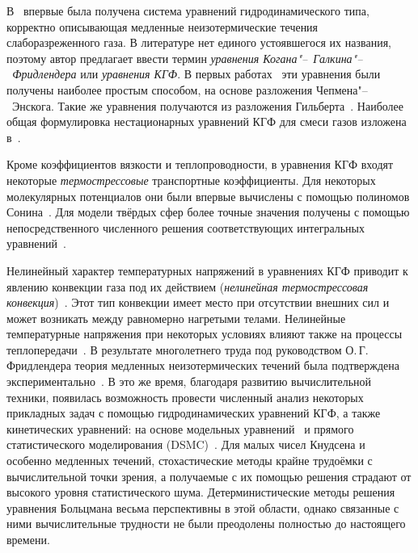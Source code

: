 \documentclass[
aps,%
12pt,%
final,%
notitlepage,%
oneside,%
onecolumn,%
nobibnotes,%
nofootinbib,%
superscriptaddress,%
noshowpacs,%
showkeys,%
centertags]%
{revtex4}
\begin{document}
В~\cite{Kogan1970} впервые была получена система уравнений гидродинамического типа,
корректно описывающая медленные неизотермические течения слаборазреженного газа.
В литературе нет единого устоявшегося их названия,
поэтому автор предлагает ввести термин \emph{уравнения Когана"--~Галкина"--~Фридлендера}
или \emph{уравнения КГФ}.
В первых работах~\cite{Kogan1970, Kogan1971} эти уравнения были получены наиболее простым способом,
на основе разложения Чепмена"--~Энскога. Такие же уравнения получаются из разложения Гильберта~\cite{Galkin1974}.
Наиболее общая формулировка нестационарных уравнений КГФ для смеси газов изложена в~\cite{Galkin2015}.

Кроме коэффициентов вязкости и теплопроводности, в уравнения КГФ входят некоторые
\emph{термострессовые} транспортные коэффициенты. Для некоторых молекулярных потенциалов они
были впервые вычислены с помощью полиномов Сонина~\cite{Burnett1935, Chapman1960}.
Для модели твёрдых сфер более точные значения получены с помощью
непосредственного численного решения соответствующих интегральных уравнений~\cite{Sone1996, Sone2002, Sone2007}.

Нелинейный характер температурных напряжений в уравнениях КГФ приводит к
явлению конвекции газа под их действием (\emph{нелинейная термострессовая конвекция})~\cite{Kogan1971}.
Этот тип конвекции имеет место при отсутствии внешних сил и может возникать между равномерно нагретыми телами.
Нелинейные температурные напряжения при некоторых условиях влияют также на процессы теплопередачи~\cite{Friedlander1978}.
В результате многолетнего труда под руководством О.\,Г. Фридлендера теория медленных неизотермических течений
была подтверждена экспериментально~\cite{Friedlander1997, Friedlander2003}.
В это же время, благодаря развитию вычислительной техники, появилась возможность провести численный анализ
некоторых прикладных задач с помощью гидродинамических уравнений КГФ, а также кинетических уравнений:
на основе модельных уравнений~\cite{Alexandrov2002, Aoki2006, Alexandrov2008b, Alexandrov2011, Rykov2008}
и прямого статистического моделирования (DSMC)~\cite{Alexandrov2008a, Aoki2007}.
Для малых чисел Кнудсена и особенно медленных течений, стохастические методы крайне трудоёмки с вычислительной точки зрения,
а получаемые с их помощью решения страдают от высокого уровня статистического шума.
Детерминистические методы решения уравнения Больцмана весьма перспективны в этой области,
однако связанные с ними вычислительные трудности не были преодолены полностью до настоящего времени.
\end{document}
